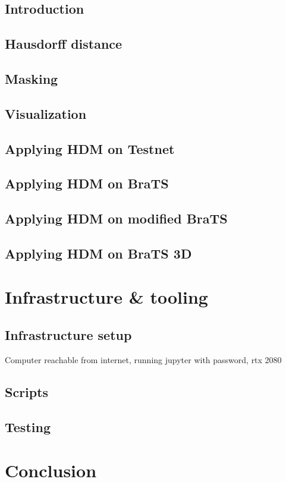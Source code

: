 \section{Introduction}
\section{Hausdorff distance}
\section{Masking}
\section{Visualization}
\section{Applying HDM on Testnet}
\section{Applying HDM on BraTS}
\section{Applying HDM on modified BraTS}
\section{Applying HDM on BraTS 3D}

\chapter{Infrastructure \& tooling}
\section{Infrastructure setup}
Computer reachable from internet, running jupyter with password,
rtx 2080

\section{Scripts}

\section{Testing}


\chapter{Conclusion}